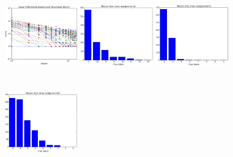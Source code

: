\begin{figure}[h]
	\endminipage
	\includegraphics[width=3.2cm, height=3.7cm]{img/M_g_regular/figure_3}
	\endminipage
		\vspace{-0.4cm}
	\includegraphics[width=3.2cm, height=3.7cm]{img/M_g_peaks/figure_5}
	\endminipage
	\includegraphics[width=3.2cm, height=3.7cm]{img/M_g_power_law/figure_5} 
	\endminipage
	\includegraphics[width=3.2cm, height=3.7cm]{img/M_g_regular/figure_5}
	\endminipage



\end{figure}
